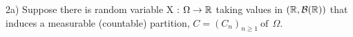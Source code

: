 2a)
Suppose there is random variable X : $\Omega \rightarrow \mathbb{R} $ taking values in $(\mathbb{R}, \mathcal{B}(\mathbb{R}))$ that induces a measurable (countable) partition, $ C = (C_n)_{n \geq 1} \ \text{of} \ \ \Omega $.
